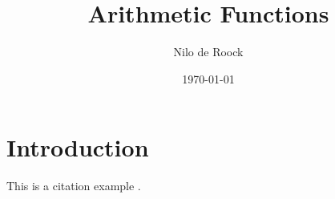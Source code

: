 \documentclass{article}
\begin{document}
\title{Arithmetic Functions}
\author{Nilo de Roock}
\date{\today}
\maketitle

\section{Introduction}
This is a citation example \cite{apostol1976}.

\printbibliography %
\end{document}
